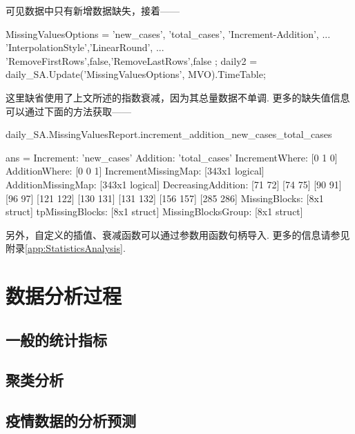 \documentclass[a4paper, titlepage]{article}
\begin{document}
可见数据中只有新增数据缺失，接着——
\begin{matlabcode}
MissingValuesOptions = { {'new_cases', 'total_cases'}, 'Increment-Addition', ...
        {'InterpolationStyle','LinearRound', ...
        'RemoveFirstRows',false,'RemoveLastRows',false}
    };
daily2 = daily_SA.Update('MissingValuesOptions', MVO).TimeTable;
\end{matlabcode}
这里缺省使用了上文所述的指数衰减，因为其总量数据不单调. 更多的缺失值信息可以通过下面的方法获取——
\begin{spacing}{0.7}
\begin{matlabcode}
daily_SA.MissingValuesReport.increment_addition_new_cases_total_cases
\end{matlabcode}
\begin{matlaboutput}
ans = 
          Increment: 'new_cases'
           Addition: 'total_cases'
     IncrementWhere: [0 1 0]
      AdditionWhere: [0 0 1]
IncrementMissingMap: [343x1 logical]
 AdditionMissingMap: [343x1 logical]
 DecreasingAddition: {[71 72] [74 75] [90 91] [96 97] [121 122] [130 131] 
                      [131 132] [156 157] [285 286]}
      MissingBlocks: [8x1 struct]
    tpMissingBlocks: [8x1 struct]
 MissingBlocksGroup: [8x1 struct]
\end{matlaboutput}
\end{spacing}
另外，自定义的插值、衰减函数可以通过参数用函数句柄导入. 更多的信息请参见附录\ref{app:StatisticsAnalysis}. 
    \section{数据分析过程}\label{数据分析}
    \subsection{一般的统计指标}\label{一般的统计指标}
    \subsection{聚类分析}
    \subsection{疫情数据的分析预测}
    \newpage
    \appendix
\end{document}
